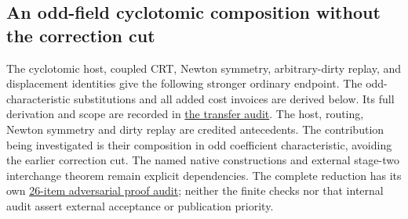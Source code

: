 \subsection{An odd-field cyclotomic composition without the correction cut}
\label{sec:oddcyclotomichost}
The cyclotomic host, coupled CRT, Newton symmetry, arbitrary-dirty replay,
and displacement identities give the following stronger ordinary
endpoint. The odd-characteristic substitutions and all added cost
invoices are derived below. Its full derivation and scope are recorded in
\href{ODD_CYCLOTOMIC_HOST_TRANSFER_20261030.txt}{the transfer audit}.
The host, routing, Newton symmetry and dirty replay are credited
antecedents. The contribution being investigated is their composition
in odd coefficient characteristic, avoiding the earlier correction cut.
The named native constructions and external stage-two interchange
theorem remain explicit dependencies. The complete reduction has its
own \href{ODD_CYCLOTOMIC_FULL_ADVERSARIAL_AUDIT_20261030.txt}{26-item adversarial proof audit};
neither the finite checks nor that internal audit assert external
acceptance or publication priority.

